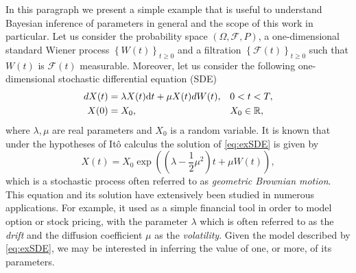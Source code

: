 In this paragraph we present a simple example that is useful to understand Bayesian inference of parameters in general and the scope of this work in particular. Let us consider the probability space $(\Omega, \mathcal{F}, P)$, a one-dimensional standard Wiener process $\left\{W(t)\right\}_{t\geq 0}$ and a filtration $\left\{\mathcal{F}(t)\right\}_{t\geq 0}$ such that $W(t)$ is $\mathcal{F}(t)$ measurable. Moreover, let us consider the following one-dimensional stochastic differential equation (SDE)
\begin{equation}\label{eq:exSDE}
\begin{aligned}
	dX(t) &= \lambda X(t) \dd t + \mu X(t) dW(t), && 0 < t < T, \\
	X(0) &= X_0, && X_0 \in \mathbb{R},
\end{aligned}
\end{equation}
where $\lambda, \mu$ are real parameters and $X_0$ is a random variable. It is known that under the hypotheses of It\^o calculus the solution of \eqref{eq:exSDE} is given by
\begin{equation}
	X(t) = X_0 \exp\left(\left(\lambda - \frac{1}{2}\mu^2\right)t + \mu W(t)\right),
\end{equation}
which is a stochastic process often referred to as \textit{geometric Brownian motion}. This equation and its solution have extensively been studied  in numerous applications. For example, it used as a simple financial tool in order to model option or stock pricing, with the parameter $\lambda$ which is often referred to as the \textit{drift} and the diffusion coefficient $\mu$ as the \textit{volatility}. Given the model described by \eqref{eq:exSDE}, we may be interested in inferring the value of one, or more, of its parameters. 


